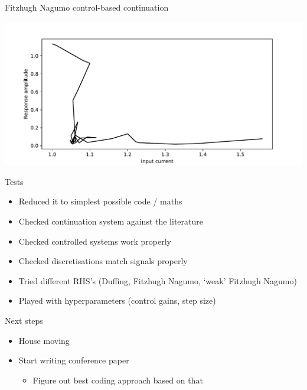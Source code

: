 \documentclass[presentation]{beamer}
\begin{document}
\begin{frame}[label={sec:org6f81666}]{Fitzhugh Nagumo control-based continuation}
\begin{center}
\includegraphics[width=.9\linewidth]{./FH_CBC.pdf}
\end{center}
\end{frame}

\begin{frame}[label={sec:org0d15fef}]{Tests}
\begin{itemize}
\item Reduced it to simplest possible code / maths
\item Checked continuation system against the literature
\item Checked controlled systems work properly
\item Checked discretisations match signals properly
\item Tried different RHS's (Duffing, Fitzhugh Nagumo, `weak' Fitzhugh Nagumo)
\item Played with hyperparameters (control gains, step size)
\end{itemize}
\end{frame}

\begin{frame}[label={sec:org50e72e9}]{Next steps}
\begin{itemize}
\item House moving
\item Start writing conference paper
\begin{itemize}
\item Figure out best coding approach based on that
\end{itemize}
\end{itemize}
\end{frame}
\end{document}
